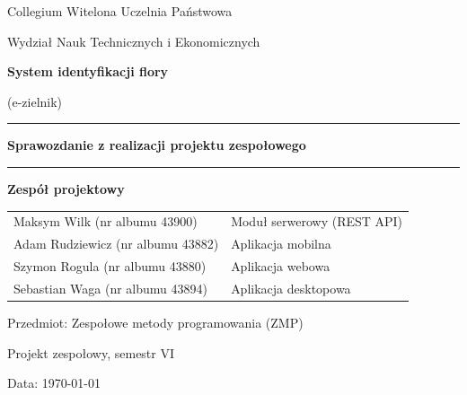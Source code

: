 \documentclass[12pt,a4paper]{article}
\begin{document}
\begin{titlepage}
\centering
\vspace*{0.5cm}

{\large Collegium Witelona Uczelnia Pa\'nstwowa\par}
\vspace{0.3cm}
{\large Wydzia\l{} Nauk Technicznych i Ekonomicznych\par}

\vfill

{\Huge\bfseries System identyfikacji flory\par}
\vspace{0.5cm}
{\LARGE (e-zielnik)\par}

\vspace{1.4cm}
\rule{0.8\textwidth}{0.4pt}\par
\vspace{0.7cm}
{\Large\bfseries Sprawozdanie z realizacji projektu zespo\l{}owego\par}
\vspace{0.7cm}
\rule{0.8\textwidth}{0.4pt}\par

\vspace{2.0cm}

{\large\bfseries Zesp\'o\l{} projektowy\par}
\vspace{0.6cm}
{\large
\begin{tabular}{@{}ll@{}}
Maksym Wilk (nr albumu 43900)      & Modu\l{} serwerowy (REST API) \\[3pt]
Adam Rudziewicz (nr albumu 43882)  & Aplikacja mobilna \\[3pt]
Szymon Rogula (nr albumu 43880)    & Aplikacja webowa \\[3pt]
Sebastian Waga (nr albumu 43894)   & Aplikacja desktopowa \\
\end{tabular}\par
}

\vfill

{\large Przedmiot: Zespo\l{}owe metody programowania (ZMP)\par}
\vspace{0.2cm}
{\large Projekt zespo\l{}owy, semestr VI\par}
\vspace{0.6cm}
{\large Data: \today\par}

\end{titlepage}
\end{document}
